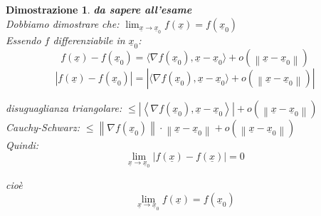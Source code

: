 \documentclass[10pt,landscape, a4paper]{article}
\newtheorem{demnstrn}{Dimostrazione}
\newenvironment{dimostrazione}{\begin{mdframed}[backgroundcolor=white]\begin{demnstrn}}{\end{demnstrn}\end{mdframed}}
\begin{document}
\begin{multicols}{3}
\begin{dimostrazione}
	\emph{\textbf{da sapere all'esame}}\\
	Dobbiamo dimostrare che: $\lim_{\underline{x} \to \underline{x}_0} f(\underline{x}) = f(\underline{x}_0)$\\
	Essendo $f$ differenziabile in $\underline{x}_0$:\\
	\begin{equation}
		f(\underline{x}) - f(\underline{x}_0) = \langle \nabla f(\underline{x}_0), \underline{x} - \underline{x}_0 \rangle + o(\left\lVert \underline{x} - \underline{x}_0\right\rVert )
	\end{equation}
	\begin{equation}
		\left\lvert f(\underline{x}) - f(\underline{x}_0) \right\rvert = \left\lvert \langle \nabla f(\underline{x}_0), \underline{x} - \underline{x}_0 \rangle + o(\left\lVert \underline{x} - \underline{x}_0\right\rVert )\right\rvert 
	\end{equation}

	disuguaglianza triangolare: $\leq | \left\langle \nabla f(\underline{x}_0), \underline{x} - \underline{x}_0 \right\rangle | +  o(\left\lVert \underline{x} - \underline{x}_0 \right\rVert ) $\\

	Cauchy-Schwarz: $\leq \left\lVert \nabla f(\underline{x}_0) \right\rVert \cdot \left\lVert \underline{x} - \underline{x}_0 \right\rVert + o(\left\lVert \underline{x} - \underline{x}_0 \right\rVert )$\\

	Quindi:
	\begin{equation}
		\lim_{\underline{x} \to \underline{x}_0} \left\lvert f(\underline{x}) - f(\underline{x})\right\rvert = 0
	\end{equation}

	cioè
	\begin{equation}
		\lim_{\underline{x} \to \underline{x}_0} f(\underline{x}) = f(\underline{x}_0)
	\end{equation}
\end{dimostrazione}





\end{multicols}
\end{document}
